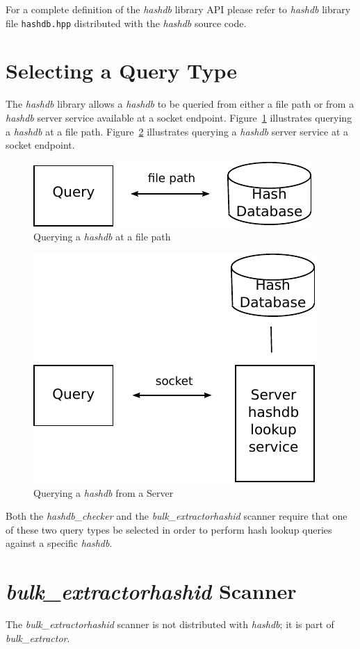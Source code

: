 \documentclass[11pt,twoside]{article}
\newcommand \bulk {\textit{bulk\_extractor}\xspace}
\newcommand \hdb {\textit{hashdb}\xspace}
\newcommand \hdbc {\textit{hashdb\_checker}\xspace}
\newcommand \hid {\textit{hashid}\xspace}
\begin{document}
For a complete definition of the \hdb library API
please refer to \hdb library file \texttt{hashdb.hpp}
distributed with the \hdb source code.

\section{Selecting a Query Type}
The \hdb library allows a \hdb to be queried
from either a file path
or from a \hdb server service available at a socket endpoint.
Figure~\ref{fig:query_path} illustrates querying a \hdb at a file path.
Figure~\ref{fig:query_socket} illustrates querying a \hdb server service
at a socket endpoint.
\begin{figure}[h]
	\center
	\includegraphics[scale=1.0]{drawings/query_path.pdf}
	\caption{Querying a \hdb at a file path}
	\label{fig:query_path}
\end{figure}
\begin{figure}[h]
	\center
	\includegraphics[scale=1.0]{drawings/query_socket.pdf}
	\caption{Querying a \hdb from a Server}
	\label{fig:query_socket}
\end{figure}

Both the \hdbc and the \bulk \hid scanner require that one of these two
query types be selected in order to perform hash lookup queries
against a specific \hdb.

\section{\bulk \hid Scanner\label{hid-scanner}}
The \bulk \hid scanner is not distributed with \hdb; it is part of \bulk.
\end{document}
